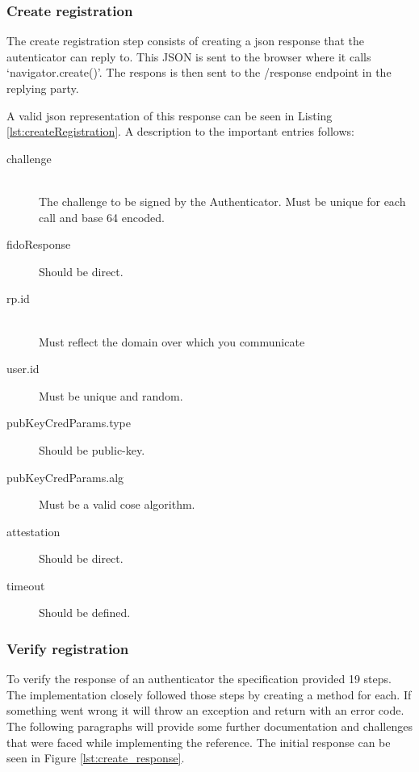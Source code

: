 \documentclass[a4paper, 11pt]{scrartcl}
\begin{document}
\subsubsection{Create registration}

The create registration step consists of creating a \gls{json} response that the autenticator can reply to. This JSON is sent to the browser where it calls `navigator.create()'. The respons is then sent to the /response endpoint in the replying party.

A valid \gls{json} representation of this response can be seen in Listing \ref{lst:createRegistration}. A description to the important entries follows:



\begin{description}
  \item[challenge] \hfill \\ The challenge to be signed by the Authenticator. Must be unique for each call and base 64 encoded.
  \item[fidoResponse] Should be direct. 
  \item[rp.id] \hfill \\ Must reflect the domain over which you communicate
  \item[user.id] Must be unique and random. 
  \item[pubKeyCredParams.type] Should be public-key. 
  \item[pubKeyCredParams.alg] Must be a valid \gls{cose} algorithm. \cite{cose}
  \item[attestation] Should be direct.
  \item[timeout] Should be defined.   
\end{description}


\subsubsection{Verify registration}

To verify the response of an authenticator the specification provided 19 steps. The implementation closely followed those steps by creating a method for each. If something went wrong it will throw an exception and return with an error code. The following paragraphs will provide some further documentation and challenges that were faced while implementing the reference. The initial response can be seen in Figure \ref{lst:create_response}.
\end{document}
